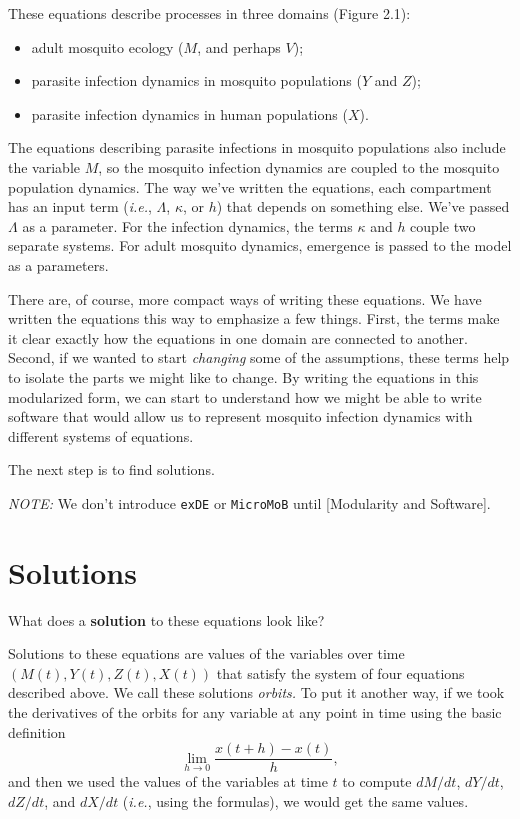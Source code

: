 \documentclass[
]{book}
\begin{document}
These equations describe processes in three domains (Figure 2.1):

\begin{itemize}
\item
  adult mosquito ecology (\(M\), and perhaps \(V\));
\item
  parasite infection dynamics in mosquito populations (\(Y\) and \(Z\));
\item
  parasite infection dynamics in human populations (\(X\)).
\end{itemize}

The equations describing parasite infections in mosquito populations also include the variable \(M\), so the mosquito infection dynamics are coupled to the mosquito population dynamics. The way we've written the equations, each compartment has an input term (\emph{i.e.}, \(\Lambda\), \(\kappa\), or \(h\)) that depends on something else. We've passed \(\Lambda\) as a parameter. For the infection dynamics, the terms \(\kappa\) and \(h\) couple two separate systems. For adult mosquito dynamics, emergence is passed to the model as a parameters.

There are, of course, more compact ways of writing these equations. We have written the equations this way to emphasize a few things. First, the terms make it clear exactly how the equations in one domain are connected to another. Second, if we wanted to start \emph{changing} some of the assumptions, these terms help to isolate the parts we might like to change. By writing the equations in this modularized form, we can start to understand how we might be able to write software that would allow us to represent mosquito infection dynamics with different systems of equations.

The next step is to find solutions.

\emph{NOTE:} We don't introduce \texttt{exDE} or \texttt{MicroMoB} until {[}Modularity and Software{]}.

\hypertarget{solutions}{%
\section{Solutions}\label{solutions}}

What does a \textbf{solution} to these equations look like?

Solutions to these equations are values of the variables over time \(\left( M(t), Y(t), Z(t), X(t) \right)\) that satisfy the system of four equations described above. We call these solutions \emph{orbits.} To put it another way, if we took the derivatives of the orbits for any variable at any point in time using the basic definition \[\lim_{h\rightarrow 0} \frac{x(t+h)-x(t)}{h},\] and then we used the values of the variables at time \(t\) to compute \(dM/dt\), \(dY/dt\), \(dZ/dt\), and \(dX/dt\) (\emph{i.e.}, using the formulas), we would get the same values.
\end{document}

